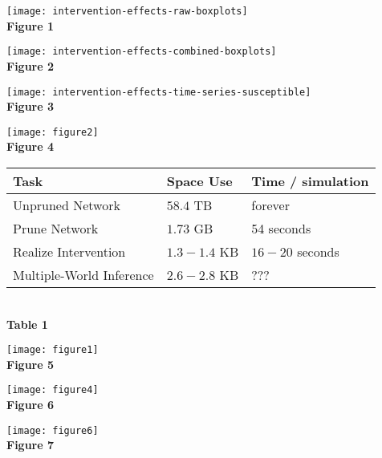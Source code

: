 \documentclass{article}%
\begin{document}
\centering
\begin{minipage}{.45\textwidth}
\texttt{[image: intervention-effects-raw-boxplots]}
\centering
\\\textbf{Figure 1}
\end{minipage}
\begin{minipage}{.45\textwidth}
\texttt{[image: intervention-effects-combined-boxplots]}
\centering
\\\textbf{Figure 2}
\end{minipage}
\begin{minipage}{.6\textwidth}
\texttt{[image: intervention-effects-time-series-susceptible]}
\centering
\\\textbf{Figure 3}
\end{minipage}
\begin{minipage}{.4\textwidth}
\texttt{[image: figure2]}
\centering
\\\textbf{Figure 4}
\end{minipage}
\begin{minipage}{.4\textwidth}
\begin{tabular}{|l|l|l|}
  \hline
  Task & Space Use & Time / simulation\\\hline
  Unpruned Network & $58.4$ TB & forever \\\hline
  Prune Network & $1.73$ GB & 54 seconds \\\hline
  Realize Intervention& $1.3-1.4$ KB & $16-20$ seconds \\\hline
  Multiple-World Inference& $2.6-2.8$ KB & ??? \\\hline
\end{tabular}
\centering
\\\textbf{Table 1}
\end{minipage}
  
\newpage
\begin{minipage}{\textwidth}
\texttt{[image: figure1]}
\centering
\\\textbf{Figure 5}
\end{minipage}
\begin{minipage}{\textwidth}
\texttt{[image: figure4]}
\centering
\\\textbf{Figure 6}
\end{minipage}
\begin{minipage}{\textwidth}
\texttt{[image: figure6]}
\centering
\\\textbf{Figure 7}
\end{minipage}
\end{document}
